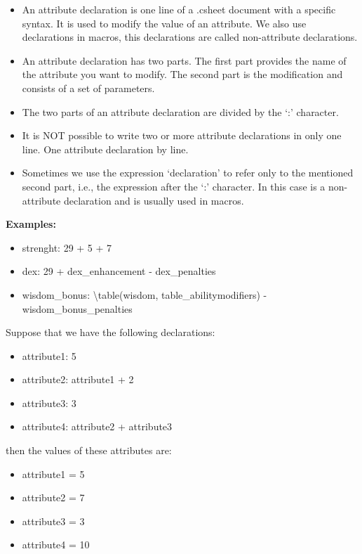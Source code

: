 \documentclass[11pt,a4paper,openright,oneside]{book}
\newenvironment{exs}
{
  \setlength{\parindent}{0cm}
  \large \textbf{Examples:} \normalsize
}
{}
\begin{document}
\begin{itemize}
\item
An attribute declaration is one line of a .csheet document with a specific syntax. It is used to modify the value of an attribute. We also use declarations in macros, this declarations are called non-attribute declarations.
\item
An attribute declaration has two parts. The first part provides the name of the attribute you want to modify. 
The second part is the modification and consists of a set of parameters.
\item
The two parts of an attribute declaration are divided by the `\textsf{:}' character. 
\item
It is NOT possible to write two or more attribute declarations in only one line. One attribute declaration by line.
\item
Sometimes we use the expression `declaration' to refer only to the mentioned second part, i.e., the expression after the `\textsf{:}' character. In this case is a non-attribute declaration and is usually used in macros.
\end{itemize}

\begin{exs}
\begin{itemize}
  \item \textsf{strenght: 29 + 5 + 7}
  \item \textsf{dex: 29 + dex\_enhancement - dex\_penalties}
  \item \textsf{wisdom\_bonus: \textbackslash table(wisdom, table\_abilitymodifiers) - wisdom\_bonus\_penalties}
\end{itemize}
\end{exs}
Suppose that we have the following declarations:
\begin{itemize}
  \item \textsf{attribute1: 5}
  \item \textsf{attribute2: attribute1 + 2}
  \item \textsf{attribute3: 3}
  \item \textsf{attribute4: attribute2 + attribute3}
\end{itemize}
then the values of these attributes are:
\begin{itemize}
  \item \textsf{attribute1 = 5}
  \item \textsf{attribute2 = 7}
  \item \textsf{attribute3 = 3}
  \item \textsf{attribute4 = 10}
\end{itemize}
\end{document}
